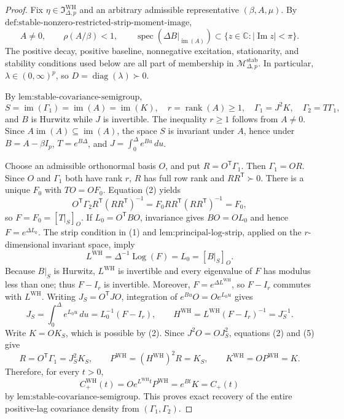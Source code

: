 \documentclass{article}
\begin{document}
\begin{proof}
Fix \(\eta\in\mathfrak I_{\Delta,p}^{\mathrm{WH}}\) and an arbitrary admissible representative \((\beta,A,\mu)\).  By \(\text{def:stable-nonzero-restricted-strip-moment-image}\),
\[
 A\neq0,\qquad \rho(A/\beta)<1,\qquad
 \operatorname{spec}\!\left(\left.\Delta B\right|_{\operatorname{im}(A)}\right)
 \subset\{z\in\mathbb C:|\operatorname{Im}z|<\pi\}.
\tag{1}
\]
The positive decay, positive baseline, nonnegative excitation, stationarity, and stability conditions used below are all part of membership in \(\mathcal M_{\Delta,p}^{\mathrm{stab}}\).  In particular, \(\lambda\in(0,\infty)^p\), so \(D=\operatorname{diag}(\lambda)\succ0\).

By \(\text{lem:stable-covariance-semigroup}\),
\[
 S=\operatorname{im}(\Gamma_1)=\operatorname{im}(A)=\operatorname{im}(K),\quad
 r=\operatorname{rank}(A)\geq1,\quad
 \Gamma_1=J^2K,\quad \Gamma_2=T\Gamma_1,
\tag{2}
\]
and \(B\) is Hurwitz while \(J\) is invertible.  The inequality \(r\geq1\) follows from \(A\neq0\).  Since \(A\operatorname{im}(A)\subseteq\operatorname{im}(A)\), the space \(S\) is invariant under \(A\), hence under \(B=A-\beta I_p\), \(T=e^{B\Delta}\), and \(J=\int_0^\Delta e^{Bu}\,du\).

Choose an admissible orthonormal basis \(O\), and put \(R=O^{\mathsf T}\Gamma_1\).  Then \(\Gamma_1=OR\).  Since \(O\) and \(\Gamma_1\) both have rank \(r\), \(R\) has full row rank and \(RR^{\mathsf T}\succ0\).  There is a unique \(F_0\) with \(TO=OF_0\).  Equation (2) yields
\[
 O^{\mathsf T}\Gamma_2R^{\mathsf T}(RR^{\mathsf T})^{-1}
 =F_0RR^{\mathsf T}(RR^{\mathsf T})^{-1}=F_0,
\tag{3}
\]
so \(F=F_0=[T|_S]_O\).  If \(L_0=O^{\mathsf T}BO\), invariance gives \(BO=OL_0\) and hence \(F=e^{\Delta L_0}\).  The strip condition in (1) and \(\text{lem:principal-log-strip}\), applied on the \(r\)-dimensional invariant space, imply
\[
 L^{\mathrm{WH}}=\Delta^{-1}\operatorname{Log}(F)=L_0=[B|_S]_O.
\tag{4}
\]
Because \(B|_S\) is Hurwitz, \(L^{\mathrm{WH}}\) is invertible and every eigenvalue of \(F\) has modulus less than one; thus \(F-I_r\) is invertible.  Moreover, \(F=e^{\Delta L^{\mathrm{WH}}}\), so \(F-I_r\) commutes with \(L^{\mathrm{WH}}\).  Writing \(J_S=O^{\mathsf T}JO\), integration of \(e^{Bu}O=Oe^{L_0u}\) gives
\[
 J_S=\int_0^\Delta e^{L_0u}\,du
 =L_0^{-1}(F-I_r),\qquad
 H^{\mathrm{WH}}=L^{\mathrm{WH}}(F-I_r)^{-1}=J_S^{-1}.
\tag{5}
\]
Write \(K=OK_S\), which is possible by (2).  Since \(J^2O=OJ_S^2\), equations (2) and (5) give
\[
 R=O^{\mathsf T}\Gamma_1=J_S^2K_S,\qquad
 P^{\mathrm{WH}}=(H^{\mathrm{WH}})^2R=K_S,\qquad
 K^{\mathrm{WH}}=OP^{\mathrm{WH}}=K.
\tag{6}
\]
Therefore, for every \(t>0\),
\[
 C_{+}^{\mathrm{WH}}(t)=Oe^{L^{\mathrm{WH}}t}P^{\mathrm{WH}}
 =e^{Bt}K=C_{+}(t)
\tag{7}
\]
by \(\text{lem:stable-covariance-semigroup}\).  This proves exact recovery of the entire positive-lag covariance density from \((\Gamma_1,\Gamma_2)\).


\end{proof}
\end{document}
